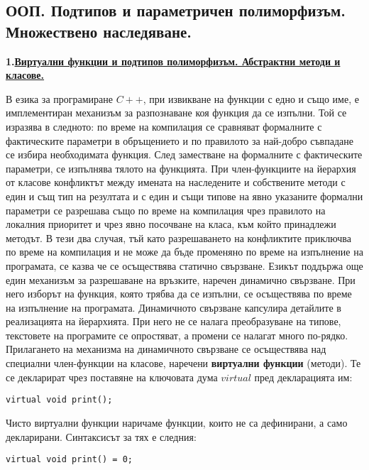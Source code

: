 \documentclass{article}
\begin{document}
\subsection*{ООП. Подтипов и параметричен полиморфизъм. Множествено наследяване.}

\textbf{1.\underline{Виртуални функции и подтипов полиморфизъм. Абстрактни методи и класове.}} \newline

В езика за програмиране $C++$, при извикване на функции с едно и също име, е имплементиран механизъм за разпознаване коя функция
да се изпълни. Той се изразява в следното: по време на компилация се сравняват формалните с фактическите параметри в обръщението
и по правилото за най-добро съвпадане се избира необходимата функция. След заместване на формалните с фактическите параметри,
се изпълнява тялото на функцията. При член-функциите на йерархия от класове конфликтът между имената на наследените и собствените
методи с един и същ тип на резултата и с един и същи типове на явно указаните формални параметри се разрешава също по време на
компилация чрез правилото на локалния приоритет и чрез явно посочване на класа, към който принадлежи методът. В тези два случая,
тъй като разрешаването на конфликтите приключва по време на компилация и не може да бъде променяно по време на изпълнение на
програмата, се казва че се осъществява статично свързване. Езикът поддържа още един механизъм за разрешаване на връзките, наречен
динамично свързване. При него изборът на функция, която трябва да се изпълни, се осъществява по време на изпълнение на програмата.
Динамичното свързване капсулира детайлите в реализацията на йерархията. При него не се налага преобразуване на типове, текстовете
на програмите се опростяват, а промени се налагат много по-рядко. Прилагането на механизма на динамичното свързване се осъществява
над специални член-функции на класове, наречени \textbf{виртуални функции} (методи). Те се декларират чрез поставяне на ключовата
дума $virtual$ пред декларацията им:
\begin{lstlisting}
virtual void print();
\end{lstlisting}

Чисто виртуални функции наричаме функции, които не са дефинирани, а само декларирани. Синтаксисът за тях е следния:
\begin{lstlisting}
virtual void print() = 0;
\end{lstlisting}
\end{document}
